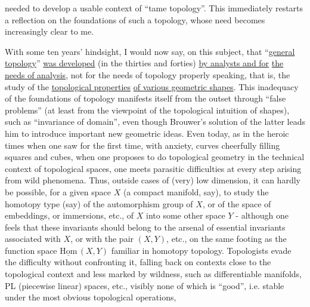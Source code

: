 
needed to develop a usable context of ``tame
topology''. This immediately restarts a reflection on the foundations
of such a topology, whose need becomes increasingly clear
to me.

With some ten years' hindsight, I would now say,
on this subject, that ``\uline{general topology}'' \uline{was developed}
(in the thirties and forties) \uline{by analysts and for}
\uline{the needs of analysis}, not for the needs of topology
properly speaking, that is, the study of the \uline{topological properties}
\uline{of various geometric shapes}. This inadequacy of the foundations
of topology manifests itself from the outset through
``false problems'' (at least from the viewpoint of the topological
intuition of shapes), such as ``invariance of domain'',
even though Brouwer's solution of the latter leads him to
introduce important new geometric ideas. Even today,
as in the heroic times when one saw for the first time, with anxiety,
curves cheerfully filling squares and cubes,
when one proposes to do topological geometry in the technical
context of topological spaces, one meets parasitic difficulties at
every step arising from wild phenomena.
Thus, outside cases of (very) low dimension, it can
hardly be possible, for a given space $X$ (a compact manifold,
say), to study the homotopy type (say) of the automorphism
group of $X$, or of the space of embeddings, or immersions, etc.,
of $X$ into some other space $Y$ - although one feels that these
invariants should belong to the arsenal of essential invariants associated
with $X$, or with the pair $(X,Y)$, etc., on the same footing
as the function space $\underline{\mathrm{Hom}}\,(X,Y)$ familiar in homotopy
topology. Topologists evade the difficulty without confronting it,
falling back on contexts close to the topological context and
less marked by wildness, such as differentiable manifolds,
PL (piecewise linear) spaces, etc., visibly none of which is ``good'',
i.e. stable under the most obvious topological operations,


